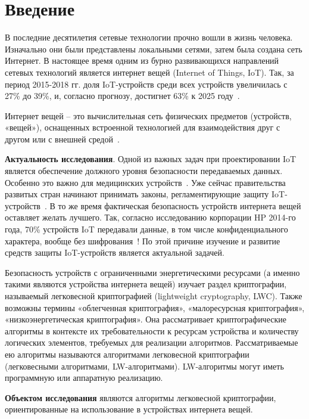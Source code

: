 \chapter*{Введение} %

В последние десятилетия сетевые технологии прочно вошли в жизнь человека. Изначально они были представлены локальными сетями, затем была создана сеть Интернет. В настоящее время одним из бурно развивающихся направлений сетевых технологий является интернет вещей (Internet of Things, IoT). Так, за период 2015-2018 гг. доля IoT-устройств среди всех устройств увеличилась с 27\% до 39\%, и, согласно прогнозу, достигнет 63\% к 2025 году~\cite{src1}. 

Интернет вещей – это вычислительная сеть физических предметов (устройств, «вещей»), оснащенных встроенной технологией для взаимодействия друг с другом или с внешней средой~\cite{src2}.

\textbf{Актуальность исследования}. Одной из важных задач при проектировании IoT является обеспечение должного уровня безопасности передаваемых данных. Особенно это важно для медицинских устройств~\cite{src3}. Уже сейчас правительства развитых стран начинают принимать законы, регламентирующие защиту IoT-устройств~\cite{src4,src5,src6}. В то же время фактическая безопасность устройств интернета вещей оставляет желать лучшего. Так, согласно исследованию корпорации HP 2014-го года, 70\% устройств IoT передавали данные, в том числе конфиденциального характера, вообще без шифрования~\cite{src7}! По этой причине изучение и развитие средств защиты IoT-устройств является актуальной задачей.

Безопасность устройств с ограниченными энергетическими ресурсами (а именно такими являются устройства интернета вещей) изучает раздел криптографии, называемый легковесной криптографией (lightweight cryptography, LWC). Также возможны термины «облегченная криптография», «малоресурсная криптография», «низкоэнергетическая криптография». Она рассматривает криптографические алгоритмы в контексте их требовательности к ресурсам устройства и количеству логических элементов, требуемых для реализации алгоритмов. Рассматриваемые ею алгоритмы называются алгоритмами легковесной криптографии (легковесными алгоритмами, LW-алгоритмами). LW-алгоритмы могут иметь программную или аппаратную реализацию.

\textbf{Объектом исследования} являются алгоритмы легковесной криптографии, ориентированные на использование в устройствах интернета вещей.

